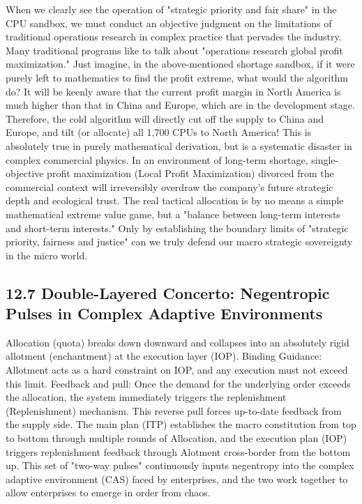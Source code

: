 \documentclass[11pt,a4paper]{article}
\begin{document}
When we clearly see the operation of "strategic priority and fair share" in the CPU sandbox, we must conduct an objective judgment on the limitations of traditional operations research in complex practice that pervades the industry. Many traditional programs like to talk about "operations research global profit maximization." Just imagine, in the above-mentioned shortage sandbox, if it were purely left to mathematics to find the profit extreme, what would the algorithm do? It will be keenly aware that the current profit margin in North America is much higher than that in China and Europe, which are in the development stage. Therefore, the cold algorithm will directly cut off the supply to China and Europe, and tilt (or allocate) all 1,700 CPUs to North America! This is absolutely true in purely mathematical derivation, but is a systematic disaster in complex commercial physics. In an environment of long-term shortage, single-objective profit maximization (Local Profit Maximization) divorced from the commercial context will irreversibly overdraw the company's future strategic depth and ecological trust. The real tactical allocation is by no means a simple mathematical extreme value game, but a "balance between long-term interests and short-term interests." Only by establishing the boundary limits of "strategic priority, fairness and justice" can we truly defend our macro strategic sovereignty in the micro world.


\subsection*{12.7 Double-Layered Concerto: Negentropic Pulses in Complex Adaptive Environments}


Allocation (quota) breaks down downward and collapses into an absolutely rigid allotment (enchantment) at the execution layer (IOP). Binding Guidance: Allotment acts as a hard constraint on IOP, and any execution must not exceed this limit. Feedback and pull: Once the demand for the underlying order exceeds the allocation, the system immediately triggers the replenishment (Replenishment) mechanism. This reverse pull forces up-to-date feedback from the supply side. The main plan (ITP) establishes the macro constitution from top to bottom through multiple rounds of Allocation, and the execution plan (IOP) triggers replenishment feedback through Alotment cross-border from the bottom up. This set of "two-way pulses" continuously inputs negentropy into the complex adaptive environment (CAS) faced by enterprises, and the two work together to allow enterprises to emerge in order from chaos.
\end{document}
